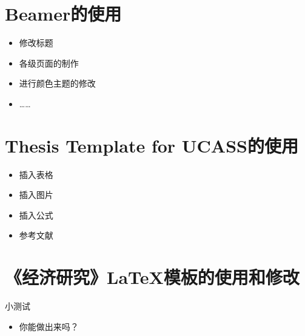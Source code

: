 \documentclass{beamer}
\begin{document}
\section{Beamer的使用}


\begin{frame}
    \begin{itemize}
        \item 修改标题
        
        \item 各级页面的制作
        
        \item {\Large 进行颜色主题的修改} 
        
        
        
        \item {……}
        
        
    \end{itemize}

\end{frame}







\section{Thesis Template for UCASS的使用}

\begin{frame}
    \begin{itemize}
       \item 插入表格
     
       \item 插入图片
       \item 插入公式
       \item 参考文献
    \end{itemize}
\end{frame}






\section{《经济研究》\LaTeX{}模板的使用和修改}



\begin{frame}{小测试}
\begin{itemize}
	\item 你能做出来吗？
	

\end{itemize}
\end{frame}
\end{document}
